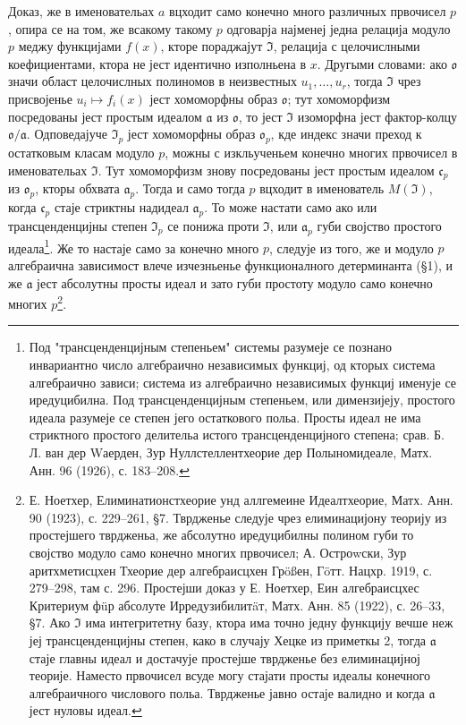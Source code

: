 \documentclass[11pt]{article}
\begin{document}
Доказ, же в именовательах \(a\) вцходит само конечно много различных првочисел \(p\), опира се на том, же всакому такому \(p\) одговарја најменеј једна релација модуло \(p\) меджу функцијами \(f(x)\), кторе пораджајут \(\mathfrak{I}\), релација с целочислными коефициентами, ктора не јест идентично изполньена в \(x\). Другыми словами: ако \(\mathfrak{o}\) значи област целочислных полиномов в неизвестных \(u_1,\ldots,u_r\), тогда \(\mathfrak{I}\) чрез присвојенье \(u_i\mapsto f_i(x)\) јест хомоморфны образ \(\mathfrak{o}\); тут хомоморфизм посредованы јест простым идеалом \(\mathfrak{a}\) из \(\mathfrak{o}\), то јест \(\mathfrak{I}\) изоморфна јест фактор-колцу \(\mathfrak{o}/\mathfrak{a}\). Одповедајуче \(\mathfrak{I}_p\) јест хомоморфны образ \(\mathfrak{o}_p\), кде индекс значи преход к остатковым класам модуло \(p\), можны с изкльученьем конечно многих првочисел в именовательах \(\mathfrak{I}\). Тут хомоморфизм знову посредованы јест простым идеалом \(\mathfrak{c}_p\) из \(\mathfrak{o}_p\), кторы обхвата \(\mathfrak{a}_p\). Тогда и само тогда \(p\) вцходит в именователь \(M(\mathfrak{I})\), когда \(\mathfrak{c}_p\) стаје стриктны надидеал \(\mathfrak{a}_p\). То може настати само ако или трансценденцијны степен \(\mathfrak{I}_p\) се понижа проти \(\mathfrak{I}\), или \(\mathfrak{a}_p\) губи својство простого идеала\footnote{Под "трансценденцијным степеньем" системы разумеје се познано инвариантно число алгебраично независимых функциј, од кторых система алгебраично зависи; система из алгебраично независимых функциј именује се иредуцибилна. Под трансценденцијным степеньем, или димензијеју, простого идеала разумеје се степен јего остаткового польа. Просты идеал не има стриктного простого делительа истого трансценденцијного степена; срав. Б. Л. ван дер Wаерден, Зур Нуллстеллентхеорие дер Полыномидеале, Матх. Анн. 96 (1926), с. 183--208.}. Же то настаје само за конечно много \(p\), следује из того, же и модуло \(p\) алгебраична зависимост влече изчезньенье функционалного детерминанта (§1), и же \(\mathfrak{a}\) јест абсолутны просты идеал и зато губи простоту модуло само конечно многих \(p\)\footnote{Е. Ноетхер, Елиминатионстхеорие унд аллгемеине Идеалтхеорие, Матх. Анн. 90 (1923), с. 229--261, §7. Тврдженье следује чрез елиминацијону теорију из простејшего тврдженьа, же абсолутно иредуцибилны полином губи то својство модуло само конечно многих првочисел; А. Остроwски, Зур аритхметисцхен Тхеорие дер алгебраисцхен Грößен, Гöтт. Нацхр. 1919, с. 279--298, там с. 296. Простејши доказ у Е. Ноетхер, Еин алгебраисцхес Критериум фüр абсолуте Ирредузибилитäт, Матх. Анн. 85 (1922), с. 26--33, §7. Ако \(\mathfrak{I}\) има интегритетну базу, ктора има точно једну функцију вечше неж јеј трансценденцијны степен, како в случају Хецке из приметкы 2, тогда \(\mathfrak{a}\) стаје главны идеал и достачује простејше тврдженье без елиминацијној теорије. Наместо првочисел всуде могу стајати просты идеалы конечного алгебраичного числового польа. Тврдженье јавно остаје валидно и когда \(\mathfrak{a}\) јест нуловы идеал.}.
\end{document}
